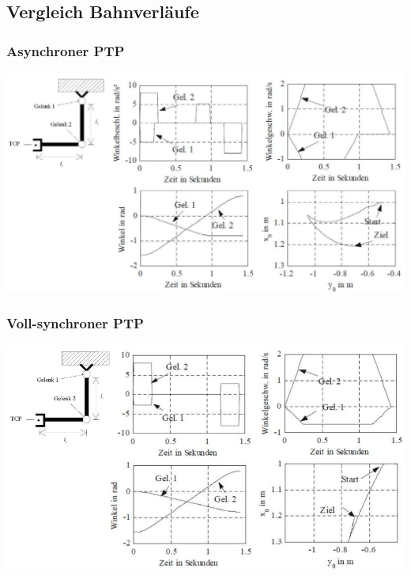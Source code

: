\subsection{Vergleich Bahnverläufe }
\begin{multicols}{3}
    \begin{minipage}{\linewidth}
        \subsubsection{Asynchroner PTP}
        \includegraphics[width=\linewidth]{./bilder/VBAPTP}
    \end{minipage}
    
    \begin{minipage}{\linewidth}
        \subsubsection{Voll-synchroner PTP}
        \includegraphics[width=\linewidth]{./bilder/VBVPTP}
    \end{minipage}
    
    \begin{minipage}{\linewidth}

\end{minipage}
\end{multicols}
